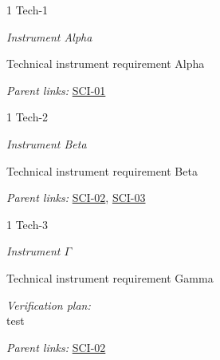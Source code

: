 \begin{frame}{1 Tech-1}

\emph{Instrument Alpha}

Technical instrument requirement Alpha

\emph{Parent links:} \href{L2.html\#SCI-01}{SCI-01}

\end{frame}

\begin{frame}{1 Tech-2}

\emph{Instrument Beta}

Technical instrument requirement Beta

\emph{Parent links:} \href{L2.html\#SCI-02}{SCI-02},
\href{L2.html\#SCI-03}{SCI-03}

\end{frame}

\begin{frame}{1 Tech-3}

\emph{Instrument \(\Gamma\)}

Technical instrument requirement Gamma

\emph{Verification plan:}\\
test

\emph{Parent links:} \href{L2.html\#SCI-02}{SCI-02}

\end{frame}
